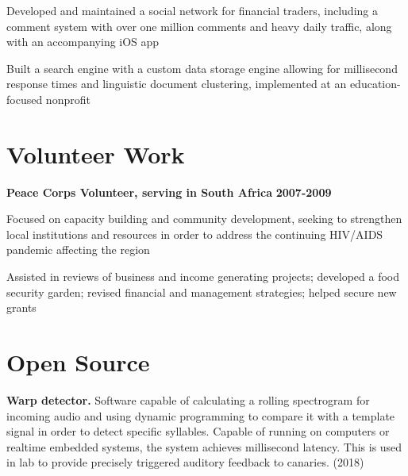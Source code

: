 	\begin{list2}
		\item Developed and maintained a social network for financial traders, including a comment system with over one million comments and heavy daily traffic, along with an accompanying iOS app
		\item Built a search engine with a custom data storage engine allowing for millisecond response times and linguistic document clustering, implemented at an education-focused nonprofit
	\end{list2}

\section*{Volunteer Work} 
	
\textbf{Peace Corps Volunteer, serving in South Africa} \hfill \textbf{2007-2009}
	
    \begin{list2}
	    \item Focused on capacity building and community development, seeking to strengthen local institutions and resources in order to address the continuing HIV/AIDS pandemic affecting the region
	    \item Assisted in reviews of business and income generating projects; developed a food security garden; revised financial and management strategies; helped secure new grants
    \end{list2}
        
%    

\section*{Open Source}
	\textbf{Warp detector.} Software capable of calculating a rolling spectrogram for incoming audio and using dynamic programming to compare it with a template signal in order to detect specific syllables. Capable of running on computers or realtime embedded systems, the system achieves millisecond latency. This is used in lab to provide precisely triggered auditory feedback to canaries. (2018)
	
